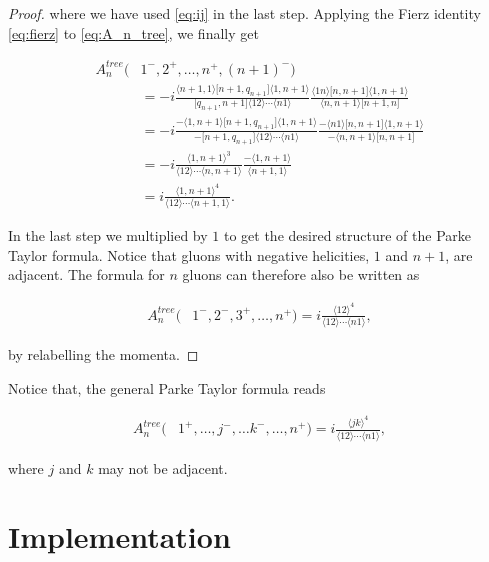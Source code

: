 \documentclass{article}
\theoremstyle{definition}
\numberwithin{equation}{section}
\begin{document}
\begin{proof}
where we have used \eqref{eq:ij} in the last step. Applying the Fierz identity \eqref{eq:fierz} to \eqref{eq:A_n_tree}, we finally get

\begin{align}
    A_n^{tree}(&1^{-}, 2^{+}, \dots , n^{+}, (n+1)^{-}) \\
    &= -i \frac{ \langle n+1,1 \rangle \lbrack n+1,q_{n+1} \rbrack \langle 1,n+1 \rangle }{ \lbrack q_{n+1},n+1 \rbrack \langle 12 \rangle \cdots \langle n1 \rangle} \frac{ \langle 1n \rangle \lbrack n,n+1 \rbrack \langle 1,n+1 \rangle }{ \langle n,n+1 \rangle \lbrack n+1,n \rbrack } \\
    &= -i \frac{ - \langle 1,n+1 \rangle \lbrack n+1,q_{n+1} \rbrack \langle 1,n+1 \rangle }{ - \lbrack n+1,q_{n+1} \rbrack \langle 12 \rangle \cdots \langle n1 \rangle} \frac{ - \langle n1 \rangle \lbrack n,n+1 \rbrack \langle 1,n+1 \rangle }{ - \langle n,n+1 \rangle \lbrack n,n+1 \rbrack } \\
    &= -i \frac{ \langle 1,n+1 \rangle^3 }{ \langle 12 \rangle \cdots \langle n,n+1 \rangle } \frac{ - \langle 1,n+1 \rangle }{ \langle n+1,1 \rangle } \\
    &= i \frac{ \langle 1,n+1 \rangle^4 }{ \langle 12 \rangle \cdots \langle n+1,1 \rangle }.
\end{align}

In the last step we multiplied by $1$ to get the desired structure of the Parke Taylor formula. Notice that gluons with negative helicities, $1$ and $n+1$, are adjacent. The formula for $n$ gluons can therefore also be written as

\begin{align}
    A_n^{tree}(&1^{-}, 2^{-}, 3^{+}, \dots , n^{+}) = i \frac{ \langle 12 \rangle^4 }{ \langle 12 \rangle \cdots \langle n1 \rangle },
\end{align}

by relabelling the momenta.

\end{proof}

Notice that, the general Parke Taylor formula reads

\begin{align}
    A_n^{tree}(&1^{+}, \dots, j^{-}, \dots k^{-}, \dots, n^{+}) = i \frac{ \langle jk \rangle^4 }{ \langle 12 \rangle \cdots \langle n1 \rangle },
\end{align}

where $j$ and $k$ may not be adjacent.  

\section{Implementation}
\end{document}
